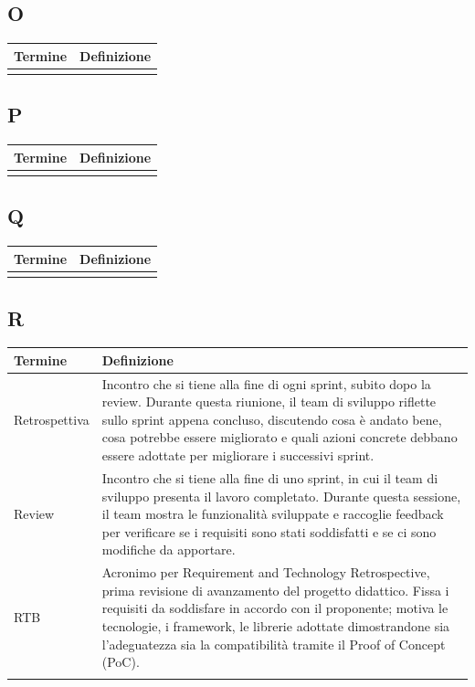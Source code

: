 \documentclass[10pt]{article}
\begin{document}
\subsection{O} %
\begin{tabularx}{\textwidth}{|>{\centering\arraybackslash}l|X|}
\hline
\rowcolor[gray]{0.8}
\textbf{Termine} & \textbf{Definizione}\\
\hline
 & \\
\hline
\end{tabularx}

\subsection{P} %
\begin{tabularx}{\textwidth}{|>{\centering\arraybackslash}l|X|}
\hline
\rowcolor[gray]{0.8}
\textbf{Termine} & \textbf{Definizione}\\
\hline
 & \\
\hline
\end{tabularx}

\subsection{Q} %
\begin{tabularx}{\textwidth}{|>{\centering\arraybackslash}l|X|}
\hline
\rowcolor[gray]{0.8}
\textbf{Termine} & \textbf{Definizione}\\
\hline
 & \\
\hline
\end{tabularx}

\subsection{R} %
\begin{tabularx}{\textwidth}{|>{\centering\arraybackslash}l|X|}
\hline
\rowcolor[gray]{0.8}
\textbf{Termine} & \textbf{Definizione}\\
\hline
Retrospettiva & Incontro che si tiene alla fine di ogni sprint, subito dopo la review. Durante questa riunione, il team di sviluppo riflette sullo sprint appena concluso, discutendo cosa è andato bene, cosa potrebbe essere migliorato e quali azioni concrete debbano essere adottate per migliorare i successivi sprint.\\
\hline
Review & Incontro che si tiene alla fine di uno sprint, in cui il team di sviluppo presenta il lavoro completato. Durante questa sessione, il team mostra le funzionalità sviluppate e raccoglie feedback per verificare se i requisiti sono stati soddisfatti e se ci sono modifiche da apportare.\\
\hline
RTB & Acronimo per Requirement and Technology Retrospective, prima revisione di avanzamento del progetto didattico. Fissa i requisiti da soddisfare in accordo con il proponente; motiva le tecnologie, i framework, le librerie adottate dimostrandone sia l'adeguatezza sia la compatibilità tramite il Proof of Concept (PoC).\\
\hline
& \\
\hline
\end{tabularx}
\end{document}
